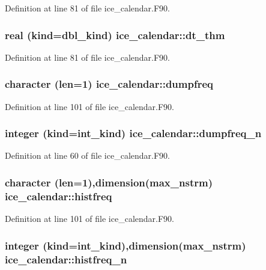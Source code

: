 Definition at line 81 of file ice\_\-calendar.F90.\hypertarget{namespaceice__calendar_a7c18b75ed60a7c1d0cbee86f4bca61de}{
\subsubsection[{dt\_\-thm}]{\setlength{\rightskip}{0pt plus 5cm}real (kind=dbl\_\-kind) {\bf ice\_\-calendar::dt\_\-thm}}}
\label{namespaceice__calendar_a7c18b75ed60a7c1d0cbee86f4bca61de}


Definition at line 81 of file ice\_\-calendar.F90.\hypertarget{namespaceice__calendar_aa26268d5abce218fad113a08bedcf8d9}{
\subsubsection[{dumpfreq}]{\setlength{\rightskip}{0pt plus 5cm}character (len=1) {\bf ice\_\-calendar::dumpfreq}}}
\label{namespaceice__calendar_aa26268d5abce218fad113a08bedcf8d9}


Definition at line 101 of file ice\_\-calendar.F90.\hypertarget{namespaceice__calendar_a0762fc870e55d2cfdfa80031188f4851}{
\subsubsection[{dumpfreq\_\-n}]{\setlength{\rightskip}{0pt plus 5cm}integer (kind=int\_\-kind) {\bf ice\_\-calendar::dumpfreq\_\-n}}}
\label{namespaceice__calendar_a0762fc870e55d2cfdfa80031188f4851}


Definition at line 60 of file ice\_\-calendar.F90.\hypertarget{namespaceice__calendar_a0502fca3c549cbfb5113eddd7de76b20}{
\subsubsection[{histfreq}]{\setlength{\rightskip}{0pt plus 5cm}character (len=1),dimension(max\_\-nstrm) {\bf ice\_\-calendar::histfreq}}}
\label{namespaceice__calendar_a0502fca3c549cbfb5113eddd7de76b20}


Definition at line 101 of file ice\_\-calendar.F90.\hypertarget{namespaceice__calendar_ab7cea996ca05518dbde0dc027ee81c13}{
\subsubsection[{histfreq\_\-n}]{\setlength{\rightskip}{0pt plus 5cm}integer (kind=int\_\-kind),dimension(max\_\-nstrm) {\bf ice\_\-calendar::histfreq\_\-n}}}
\label{namespaceice__calendar_ab7cea996ca05518dbde0dc027ee81c13}


